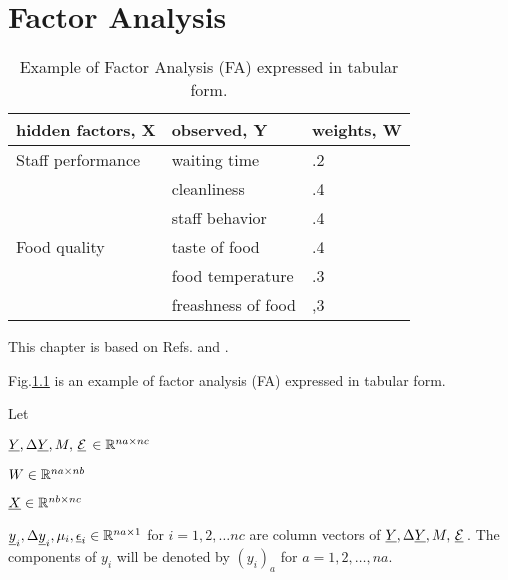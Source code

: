 \chapter{Factor Analysis}
\label{ch-factor-ana}


\begin{table}[h!]
\begin{tabular}{|l|l|l|}
\hline
hidden factors, X                          & observed, Y
           & weights, W \\ \hline
\cellcolor[HTML]{F4B9FB}Staff performance   & \cellcolor[HTML]{F4B9FB}waiting time       & .2         \\ \cline{2-3} 
\cellcolor[HTML]{F4B9FB}             & \cellcolor[HTML]{F4B9FB}cleanliness        & .4         \\ \cline{2-3} 
\cellcolor[HTML]{F4B9FB}             & \cellcolor[HTML]{F4B9FB}staff behavior     & .4         \\ \hline
\cellcolor[HTML]{B8FFDA}Food quality & \cellcolor[HTML]{B8FFDA}taste of food      & .4         \\ \cline{2-3} 
\cellcolor[HTML]{B8FFDA}             & \cellcolor[HTML]{B8FFDA}food temperature   & .3         \\ \cline{2-3} 
\cellcolor[HTML]{B8FFDA}             & \cellcolor[HTML]{B8FFDA}freashness of food & ,3         \\ \hline
\end{tabular}
\caption{Example of Factor Analysis (FA) expressed in tabular form.}
\label{tab-factor-ana}
\end{table}



This chapter is based on Refs.\cite{wiki-factor-ana} and
\cite{tipping-bishop}.

Fig.\ref{tab-factor-ana} is an example
of factor analysis (FA)
expressed in tabular form.

Let

$\rvY, \Delta\rvY, M, \rv{\cale}\in \RR^{na\times nc}$

$W\in { \mathbb{R}}^{na\times nb}$

$\rvX \in  \RR^{nb\times nc}$

$\rvy_i, \Delta\rvy_i, \mu_i, \rveps_i\in \RR^{na\times 1}$ for $i=1, 2, \ldots nc$ are column vectors of $\rvY, \Delta \rvY, M, \rv{\cale}$.
The components of $y_i$ will be denoted by $(y_i)_a$ for $a=1,2, \ldots, na$.

